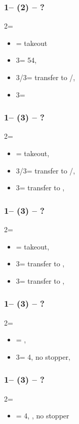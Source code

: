 \documentclass[12pt, a4paper]{article}
\begin{document}
\subsubsection*{1\clubs -- (2\nt) -- ?}
2\nt = \minor
\begin{itemize}
    \item \dbl = takeout
    \item 3\clubs = 54\major, \gf
    \item 3\diams/3\hearts = transfer to \hearts/\spades, \invp
    \item 3\spades = \nt
\end{itemize}

\subsubsection*{1\clubs -- (3\clubs) -- ?}
2\nt = \minor
\begin{itemize}
    \item \dbl = takeout, \gf
    \item 3\diams/3\hearts = transfer to \hearts/\spades, \invp
    \item 3\spades = transfer to \diams, \gf
\end{itemize}

\subsubsection*{1\clubs -- (3\diams) -- ?}
2\nt = \minor
\begin{itemize}
    \item \dbl = takeout, \gf
    \item 3\hearts = transfer to \spades, \invp
    \item 3\spades = transfer to \diams, \gf
\end{itemize}

\subsubsection*{1\clubs -- (3\hearts) -- ?}
2\nt = \minor
\begin{itemize}
    \item \dbl = \spades, \invp
    \item 3\spades = 4\spades, no \hearts stopper, \gf
\end{itemize}

\subsubsection*{1\clubs -- (3\spades) -- ?}
2\nt = \minor
\begin{itemize}
    \item \dbl = 4\hearts, \gf, no \spades stopper
\end{itemize}

\end{document}
